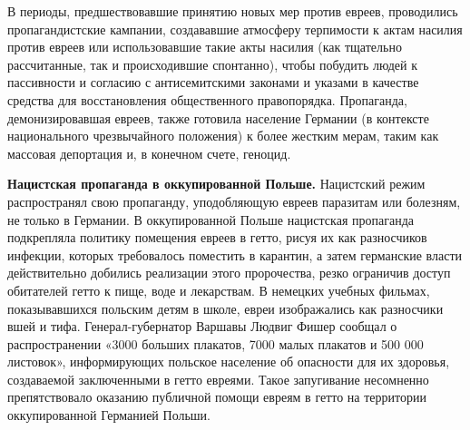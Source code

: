 В периоды, предшествовавшие принятию новых мер против евреев, проводились пропагандистские кампании, создававшие атмосферу терпимости к актам насилия против евреев или использовавшие такие акты насилия (как тщательно рассчитанные, так и происходившие спонтанно), чтобы побудить людей к пассивности и согласию с антисемитскими законами и указами в качестве средства для восстановления общественного правопорядка. Пропаганда, демонизировавшая евреев, также готовила население Германии (в контексте национального чрезвычайного положения) к более жестким мерам, таким как массовая депортация и, в конечном счете, геноцид.

\textbf{Нацистская пропаганда в оккупированной Польше.} Нацистский режим распространял свою пропаганду, уподобляющую евреев паразитам или болезням, не только в Германии. В оккупированной Польше нацистская пропаганда подкрепляла политику помещения евреев в гетто, рисуя их как разносчиков инфекции, которых требовалось поместить в карантин, а затем германские власти действительно добились реализации этого пророчества, резко ограничив доступ обитателей гетто к пище, воде и лекарствам. В немецких учебных фильмах, показывавшихся польским детям в школе, евреи изображались как разносчики вшей и тифа. Генерал-губернатор Варшавы Людвиг Фишер сообщал о распространении «3000 больших плакатов, 7000 малых плакатов и 500 000 листовок», информирующих польское население об опасности для их здоровья, создаваемой заключенными в гетто евреями. Такое запугивание несомненно препятствовало оказанию публичной помощи евреям в гетто на территории оккупированной Германией Польши.


